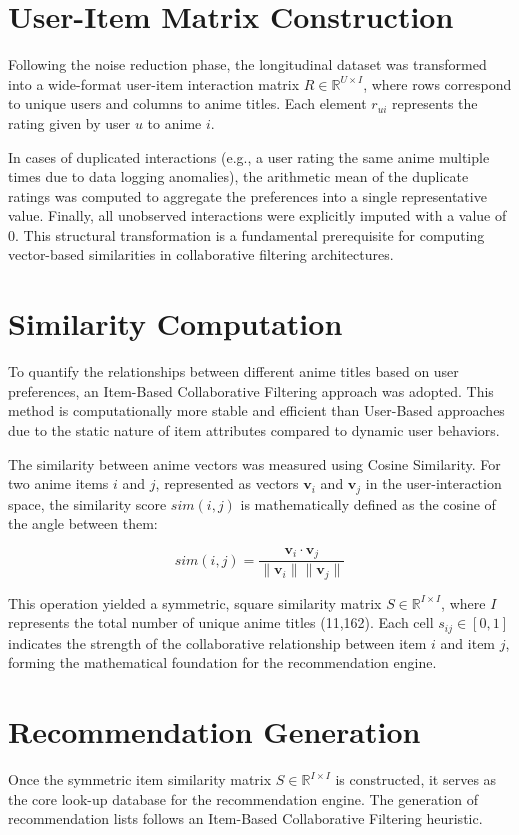 \documentclass[12pt]{article}
\begin{document}
\section{User-Item Matrix Construction}
Following the noise reduction phase, the longitudinal dataset was transformed into a wide-format user-item interaction matrix $R \in \mathbb{R}^{U \times I}$, where rows correspond to unique users and columns to anime titles. Each element $r_{ui}$ represents the rating given by user $u$ to anime $i$.

In cases of duplicated interactions (e.g., a user rating the same anime multiple times due to data logging anomalies), the arithmetic mean of the duplicate ratings was computed to aggregate the preferences into a single representative value. Finally, all unobserved interactions were explicitly imputed with a value of $0$. This structural transformation is a fundamental prerequisite for computing vector-based similarities in collaborative filtering architectures.
	
\section{Similarity Computation}
To quantify the relationships between different anime titles based on user preferences, an Item-Based Collaborative Filtering approach was adopted. This method is computationally more stable and efficient than User-Based approaches due to the static nature of item attributes compared to dynamic user behaviors.

The similarity between anime vectors was measured using Cosine Similarity. For two anime items $i$ and $j$, represented as vectors $\mathbf{v}_i$ and $\mathbf{v}_j$ in the user-interaction space, the similarity score $sim(i, j)$ is mathematically defined as the cosine of the angle between them:

\begin{equation}
	sim(i, j) = \frac{\mathbf{v}_i \cdot \mathbf{v}_j}{\|\mathbf{v}_i\| \|\mathbf{v}_j\|}
\end{equation}

This operation yielded a symmetric, square similarity matrix $S \in \mathbb{R}^{I \times I}$, where $I$ represents the total number of unique anime titles (11,162). Each cell $s_{ij} \in [0, 1]$ indicates the strength of the collaborative relationship between item $i$ and item $j$, forming the mathematical foundation for the recommendation engine.	

\section{Recommendation Generation}
Once the symmetric item similarity matrix $S \in \mathbb{R}^{I \times I}$ is constructed, it serves as the core look-up database for the recommendation engine. The generation of recommendation lists follows an Item-Based Collaborative Filtering heuristic.
\end{document}
